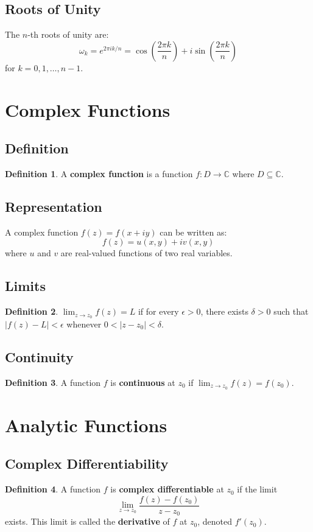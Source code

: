 \documentclass[11pt]{article}
\theoremstyle{definition}
\newtheorem{definition}{Definition}[section]
\begin{document}
\subsection{Roots of Unity}
The $n$-th roots of unity are:
$$\omega_k = e^{2\pi ik/n} = \cos\left(\frac{2\pi k}{n}\right) + i\sin\left(\frac{2\pi k}{n}\right)$$
for $k = 0, 1, \ldots, n-1$.

\section{Complex Functions}

\subsection{Definition}
\begin{definition}
A \textbf{complex function} is a function $f: D \to \mathbb{C}$ where $D \subseteq \mathbb{C}$.
\end{definition}

\subsection{Representation}
A complex function $f(z) = f(x + iy)$ can be written as:
$$f(z) = u(x,y) + iv(x,y)$$
where $u$ and $v$ are real-valued functions of two real variables.

\subsection{Limits}
\begin{definition}
$\lim_{z \to z_0} f(z) = L$ if for every $\epsilon > 0$, there exists $\delta > 0$ such that $|f(z) - L| < \epsilon$ whenever $0 < |z - z_0| < \delta$.
\end{definition}

\subsection{Continuity}
\begin{definition}
A function $f$ is \textbf{continuous} at $z_0$ if $\lim_{z \to z_0} f(z) = f(z_0)$.
\end{definition}

\section{Analytic Functions}

\subsection{Complex Differentiability}
\begin{definition}
A function $f$ is \textbf{complex differentiable} at $z_0$ if the limit
$$\lim_{z \to z_0} \frac{f(z) - f(z_0)}{z - z_0}$$
exists. This limit is called the \textbf{derivative} of $f$ at $z_0$, denoted $f'(z_0)$.
\end{definition}
\end{document}
